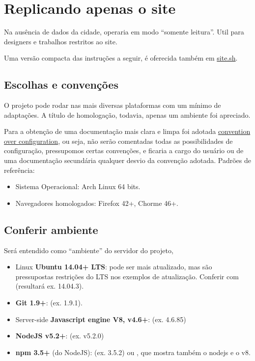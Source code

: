 \documentclass[letterpaper,10pt,english]{sphinxmanual}
\begin{document}
\section{Replicando apenas o site}
\label{index:replicando-apenas-o-site}
Na ausência de dados da cidade, operaria em modo ``somente leitura''. Util
para designers e trabalhos restritos ao site.

Uma versão compacta das instruções a seguir, é oferecida também em \href{https://github.com/okfn-brasil/cuidando2-doc/blob/master/src/site.sh}{site.sh}.


\subsection{Escolhas e convenções}
\label{install-site::doc}\label{install-site:escolhas-e-convencoes}
O projeto pode rodar nas mais diversas plataformas com um mínimo de
adaptações. A título de homologação, todavia, apenas um ambiente foi
apreciado.

Para a obtenção de uma documentação mais clara e limpa foi adotada
\href{https://en.wikipedia.org/wiki/Convention\_over\_configuration}{convention over
configuration},
ou seja, não serão comentadas todas as possibilidades de configuração,
pressupomos certas convenções, e ficaria a cargo do usuário ou de uma
documentação secundária qualquer desvio da convenção adotada. Padrões de
referência:
\begin{itemize}
\item {} 
Sistema Operacional: Arch Linux 64 bits.

\item {} 
Navegadores homologados: Firefox 42+, Chorme 46+.

\end{itemize}


\subsection{Conferir ambiente}
\label{install-site:conferir-ambiente}
Será entendido como ``ambiente'' do servidor do projeto,
\begin{itemize}
\item {} 
Linux \textbf{Ubuntu 14.04+ LTS}: pode ser mais atualizado, mas são
pressupostas restrições do LTS nos exemplos de atualização. Conferir
com  (resultará ex. 14.04.3).

\item {} 
\textbf{Git 1.9+}:  (ex. 1.9.1).

\item {} 
Server-side \textbf{Javascript engine V8, v4.6+}:
 (ex. 4.6.85)

\item {} 
\textbf{NodeJS v5.2+}: (ex. v5.2.0)

\item {} 
\textbf{npm 3.5+} (do NodeJS):  (ex. 3.5.2) ou ,
que mostra também o nodejs e o v8.

\end{itemize}
\end{document}

